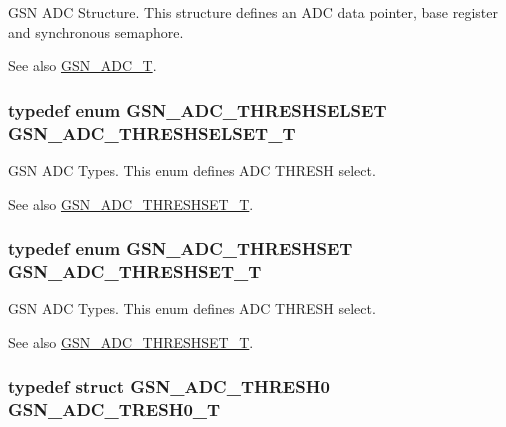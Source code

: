 GSN ADC Structure. This structure defines an ADC data pointer, base register and synchronous semaphore. 

\begin{DoxySeeAlso}{See also}
\hyperlink{a00643_ga9f5c392bf9244880ab92d22101c6131d}{GSN\_\-ADC\_\-T}. 
\end{DoxySeeAlso}
\hypertarget{a00643_gaaac97c7455490c22d89a3f33ab7355d2}{
\subsubsection[{GSN\_\-ADC\_\-THRESHSELSET\_\-T}]{\setlength{\rightskip}{0pt plus 5cm}typedef enum {\bf GSN\_\-ADC\_\-THRESHSELSET} {\bf GSN\_\-ADC\_\-THRESHSELSET\_\-T}}}
\label{a00643_gaaac97c7455490c22d89a3f33ab7355d2}


GSN ADC Types. This enum defines ADC THRESH select. 

\begin{DoxySeeAlso}{See also}
\hyperlink{a00643_ga5a5c60aaf9f413612a6b37d0eb136c48}{GSN\_\-ADC\_\-THRESHSET\_\-T}. 
\end{DoxySeeAlso}
\hypertarget{a00643_ga5a5c60aaf9f413612a6b37d0eb136c48}{
\subsubsection[{GSN\_\-ADC\_\-THRESHSET\_\-T}]{\setlength{\rightskip}{0pt plus 5cm}typedef enum {\bf GSN\_\-ADC\_\-THRESHSET} {\bf GSN\_\-ADC\_\-THRESHSET\_\-T}}}
\label{a00643_ga5a5c60aaf9f413612a6b37d0eb136c48}


GSN ADC Types. This enum defines ADC THRESH select. 

\begin{DoxySeeAlso}{See also}
\hyperlink{a00643_ga5a5c60aaf9f413612a6b37d0eb136c48}{GSN\_\-ADC\_\-THRESHSET\_\-T}. 
\end{DoxySeeAlso}
\hypertarget{a00643_ga67dc995f7880016f896f0fdf6b61309b}{
\subsubsection[{GSN\_\-ADC\_\-TRESH0\_\-T}]{\setlength{\rightskip}{0pt plus 5cm}typedef struct {\bf GSN\_\-ADC\_\-THRESH0}  {\bf GSN\_\-ADC\_\-TRESH0\_\-T}}}
\label{a00643_ga67dc995f7880016f896f0fdf6b61309b}


